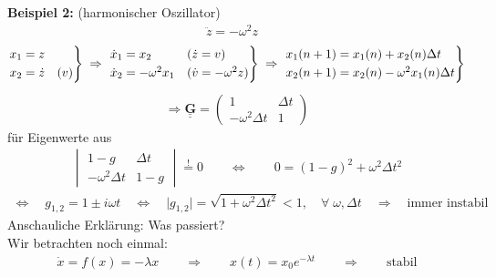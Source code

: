 \documentclass[12pt]{article}
\begin{document}
\textbf{Beispiel 2:} (harmonischer Oszillator)
\begin{align}
\ddot{z}= - \omega^2 z &  
\end{align}
\begin{align*}
\begin{rcases}
x_1 = z \\
x_2 = \dot{z} &(v)
\end{rcases}
\; \Rightarrow \; 
\begin{rcases}
\dot{x}_1 = x_2  & (\dot{z}=v) \\
\dot{x}_2 = - \omega^2 x_1 & (\dot{v}= - \omega ^2 z)
\end{rcases}  
\;  \Rightarrow \; 
\begin{rcases}
x_1 (n+1) = x_1(n) + x_2 (n) \Delta t \\
x_2 (n+1) = x_2(n) - \omega^2 x_1 (n) \Delta t
\end{rcases} 
\end{align*}
\begin{align}
\Rightarrow \underline{ \underline{\mathbf{G} }} = 
\begin{pmatrix}
 1 & \Delta t \\
 - \omega^2 \Delta t & 1
\end{pmatrix}
\end{align}
für Eigenwerte aus 
\begin{align}
\begin{vmatrix}
1-g & \Delta t \\
- \omega^2 \Delta t & 1-g
\end{vmatrix}
\overset{!}{=} 0 \quad \quad \Leftrightarrow \quad \quad 0=  (1-g)^2 + \omega^2 \Delta t^2 
\end{align}
\begin{align*}
\Leftrightarrow \quad  g_{1,2} = 1 \pm i\omega t \quad 
\Leftrightarrow  \quad \vert g_{1,2} \vert = \sqrt{1 + \omega^2 \Delta t^2} <1,\quad \forall \; \omega, \Delta t \quad \Rightarrow \quad  \mbox{immer instabil}
\end{align*}
Anschauliche Erklärung: Was passiert? \\
Wir betrachten noch einmal: 
 \begin{align}
\dot{x}= f(x) = - \lambda x \quad \quad \Rightarrow \quad \quad x(t) = x_0 e^{-\lambda t} \quad \quad \Rightarrow \quad \quad \text{stabil}
\end{align}
\end{document}
